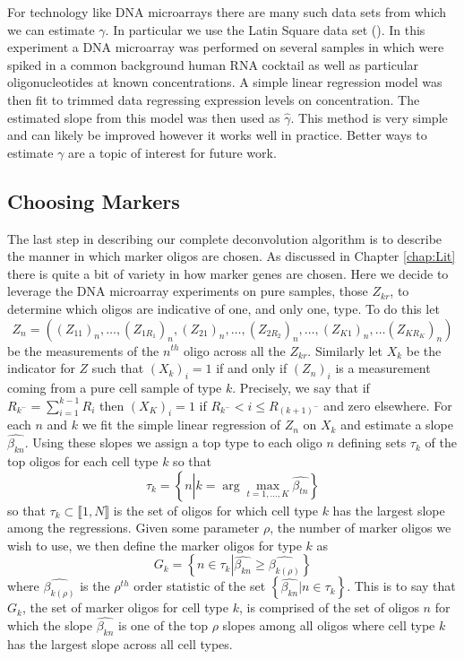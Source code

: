 \documentclass[reqno,12pt,oneside]{report}\usepackage[]{graphicx}\usepackage[]{color}
\theoremstyle{plain}
\theoremstyle{definition}
\theoremstyle{remark}
\numberwithin{theorem}{chapter}     %
\begin{document}
For technology like DNA microarrays there are many such data sets from which we can estimate $\gamma$. In particular we use the Latin Square data set (\cite{latin}). In this experiment a DNA microarray was performed on several samples in which were spiked in a common background human RNA cocktail as well as particular oligonucleotides at known concentrations. A simple linear regression model was then fit to trimmed data regressing expression levels on concentration. The estimated slope from this model was then used as $\widehat{\gamma}$. This method is very simple and can likely be improved however it works well in practice. Better ways to estimate $\gamma$ are a topic of interest for future work. 

\subsection{Choosing Markers}

The last step in describing our complete deconvolution algorithm is to describe the manner in which marker oligos are chosen. As discussed in Chapter \ref{chap:Lit} there is quite a bit of variety in how marker genes are chosen. Here we decide to leverage the DNA microarray experiments on pure samples, those $Z_{kr}$, to determine which oligos are indicative of one, and only one, type. To do this let 
$$
Z_n = ((Z_{11})_n,\ldots,(Z_{1R_1})_n,(Z_{21})_n,\ldots,(Z_{2R_2})_n,\ldots,(Z_{K1})_n,\ldots (Z_{KR_K})_n)
$$
be the measurements of the $n^{th}$ oligo across all the $Z_{kr}$. Similarly let $X_k$ be the indicator for $Z$ such that $(X_k)_i=1$ if and only if $(Z_n)_i$ is a measurement coming from a pure cell sample of type $k$. Precisely, we say that if $R_{k^-} = \sum_{i=1}^{k-1} R_i$ then $(X_K)_i = 1$ if $R_{k^-} < i \leq R_{{(k+1)}^{-}}$ and zero elsewhere. For each $n$ and $k$ we fit the simple linear regression of $Z_n$ on $X_k$ and estimate a slope $\widehat{\beta_{kn}}$. Using these slopes we assign a top type to each oligo $n$ defining sets $\tau_k$ of the top oligos for each cell type $k$ so that 
$$
\tau_k = \left\{n \left| k=\arg\max_{t=1,\ldots,K}\widehat{\beta_{tn}}\right.\right\}
$$
so that $\tau_k\subset \llbracket 1,N \rrbracket$ is the set of oligos for which cell type $k$ has the largest slope among the regressions. 
Given some parameter $\rho$, the number of marker oligos we wish to use, we then define the marker oligos for type $k$ as
$$
G_k = \left\{n \in \tau_k \left|\widehat{\beta_{kn}} \geq \widehat{\beta_{k(\rho)}}\right.\right\}
$$
where $\widehat{\beta_{k(\rho)}}$ is the $\rho^{th}$ order statistic of the set $\left\{\widehat{\beta_{kn}}\left|n\in\tau_k\right.\right\}$. This is to say that $G_k$, the set of marker oligos for cell type $k$, is comprised of the set of oligos $n$ for which the slope $\widehat{\beta_{kn}}$ is one of the top $\rho$ slopes among all oligos where cell type $k$ has the largest slope across all cell types. 
\end{document}
